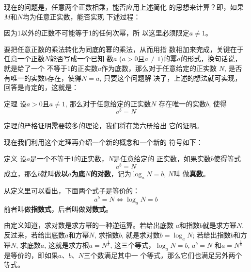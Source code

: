 现在的问题是，任意两个正数相乘，能否应用上述简化
的思想来计算？即，如果$M$和$N$均为任意正实数，能否实现
下述过程：
\begin{center}
\end{center}

\begin{rmk}
    因为1以外的正数不可能等于1的任何次幂，所
以这里必须限定$a\ne 1$。
\end{rmk}

要把任意正数的乘法转化为同底的幂的乘法，从而用指
数相加来完成，关键在于任意一个正数$N$能否写成一个已知
数$a$ ($a>0$且$a\ne1$)的幂$a$的形式，换句话说，就是给了一个
不等于1的正实数$a$作为底数，那么对于任意给定的正实数
$N$, 是否有唯一的实数$b$存在，使得$N=a$, 只要这个问题解
决了，上述的想法就可实现，回答是肯定的，这就是：

\begin{blk}{定理}
    设$a>0$且$a\ne 1$, 那么对于任意给定的正实数$N$
存在唯一的实数$b$, 使得
\[a^b=N\]
\end{blk}
 
定理的严格证明需要较多的理论，我们将在第六册给出
它的证明。

现在我们利用这个定理再介绍一个新的概念和一个新的
符号如下：

\begin{blk}{定义}
    设$a$是一个不等于1的正实数，$N$是任意给定的
正实数，如果实数$b$使得等式
\[a^b=N\]
成立，那么$b$就叫做\textbf{以$a$为底$N$的对数}，记为$\log_a N=b$, $N$叫
做\textbf{真数}。
\end{blk}
 
从定义里可以看出，下面两个式子是等价的：
\[a^b=N  \Longleftrightarrow \log_a N=b\]
前者叫做\textbf{指数式}，后者叫做\textbf{对数式}。

由定义知道，求对数是求方幂的一种逆运算。若给出底数
$a$和指数$b$就是求方幂$N$, 反过来，若给出底数$a$和方幂$N$, 
求指数$b$, 就是求对数$b=\log_a N$; 若给出指数$b$和方幂$N$, 求底数$a$, 这就是求方根$a=N^{\tfrac{1}{b}}$, 这三个等式，$\log_a N=b$, $a^b=N$
和$a=N^{\tfrac{1}{b}}$是等价的，即如果$a$、$b$、$N$三个数满足其中一
个等式，那么它们也满足另外两个等式。




